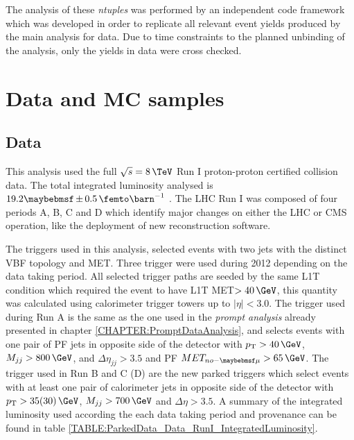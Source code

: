 The analysis of these \textit{ntuples} was performed by an independent code framework which was developed in order to replicate all relevant event yields produced by the main analysis for data. Due to time constraints to the planned unbinding of the analysis, only the yields in data were cross checked.  

\section{Data and MC samples}


\subsection{Data}


This analysis used the full  $\sqrt{s}=8\,\TeV$ Run I proton-proton certified collision data. The total integrated luminosity analysed is $19.2 \pm 0.5 \,\femto\barn^{-1}$ \cite{ARTICLE:CMSLuminosityBasedonPixelClusterCounting}. The \gls{LHC} Run I was composed of four periods A, B, C and D which identify major changes on either the \gls{LHC} or \gls{CMS} operation, like the deployment of new reconstruction software.

The triggers used in this analysis, selected events with two jets with the distinct \gls{VBF} topology and \gls{MET}. Three trigger were used during 2012 depending on the data taking period. All selected trigger paths are seeded by the same \gls{L1T} condition which required the event to have \gls{L1T} \gls{MET}$>40\,\GeV$, this quantity was calculated using calorimeter trigger towers up to $|\eta|<3.0$. The trigger used during Run A is the same as the one used in the \textit{prompt analysis} already presented in chapter \ref{CHAPTER:PromptDataAnalysis}, and selects events with one pair of \gls{PF} jets in opposite side of the detector with $\pt>40\,\GeV$, $M_{jj}>800\,\GeV$, and $\Delta\eta_{jj}>3.5$ and \gls{PF} $MET_{no-\mu}>65\,\GeV$. The trigger used in Run B and C (D) are the new parked triggers which select events with at least one pair of calorimeter jets in opposite side of the detector with $\pt>35(30)\,\GeV$, $M_{jj}>700\,\GeV$ and $\Delta\eta>3.5$. A summary of the integrated luminosity used according the each data taking period and provenance can be found in table \ref{TABLE:ParkedData_Data_RunI_IntegratedLuminosity}.

